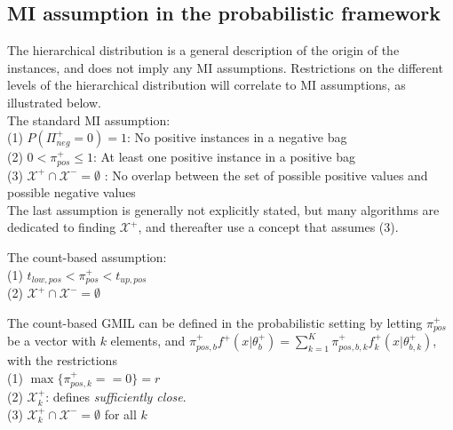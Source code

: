 %

\subsection{MI assumption in the probabilistic framework}
The hierarchical distribution is a general description of the origin of the instances, and does not imply any MI assumptions. 
Restrictions on the different levels of the hierarchical distribution will correlate to MI assumptions, as illustrated below.\\
The standard MI assumption: \\
(1) $P(\Pi^+_{neg} = 0) = 1$: No positive instances in a negative bag\\
(2) $0<\pi^+_{pos} \leq 1$: At least one positive instance in a positive bag\\
(3) $\mathcal{X}^+ \cap \mathcal{X}^- = \emptyset$ : No overlap between the set of possible positive values and possible negative values \\
The last assumption is generally not explicitly stated, but many algorithms are dedicated to finding $\mathcal{X}^+$, and thereafter use a concept that assumes (3). 

The count-based assumption:\\
(1) $t_{low,pos} < \pi^+_{pos} < t_{up,pos}$ \\
(2) $\mathcal{X}^+ \cap \mathcal{X}^- = \emptyset$ 

The count-based GMIL can be defined in the probabilistic setting by letting $\pi^+_{pos}$ be a vector with $k$ elements, and $\pi^+_{pos,b} f^+(x|\theta_b^+) = \sum_{k = 1}^K \pi^+_{pos,b,k} f^+_k(x|\theta_{b,k}^+)$, with the restrictions\\
(1) $\max \{\pi^+_{pos,k} == 0\} = r$ \\
(2) $\mathcal{X}^+_k$: defines {\it sufficiently close}. \\
(3) $\mathcal{X}^+_k \cap \mathcal{X}^- = \emptyset$ for all $k$ \\

